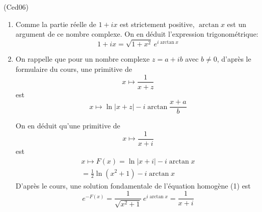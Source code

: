 \begin{tiny}(Ced06)\end{tiny} 
\begin{enumerate}
  \item Comme la partie réelle de $ 1 + ix$ est strictement positive, $\arctan x$ est un argument de ce nombre complexe. On en déduit l'expression trigonométrique:
\begin{displaymath}
  1 + ix = \sqrt{1+x^2} \, e^{i\arctan x}
\end{displaymath}

  \item On rappelle que pour un nombre complexe $z=a+ib$ avec $b\neq 0$, d'après le formulaire du cours, une primitive de 
\begin{displaymath}
  x\mapsto \frac{1}{x + z}
\end{displaymath}
est
\begin{displaymath}
  x\mapsto \ln |x+z| - i \arctan \frac{x + a}{b}
\end{displaymath}

On en déduit qu'une primitive de
\begin{displaymath}
  x\mapsto \frac{1}{x + i}
\end{displaymath}
est
\begin{multline*}
  x\mapsto F(x) = \ln |x+i| - i \arctan x \\
  = \frac{1}{2}\ln(x^2+1) -i\arctan x
\end{multline*}
D'après le cours, une solution fondamentale de l'équation homogène (1) est 
\begin{displaymath}
e^{-F(x)}=  \frac{1}{\sqrt{x^2+1}}\,e^{i\arctan x} = \frac{1}{x + i}
\end{displaymath}


\end{enumerate}
